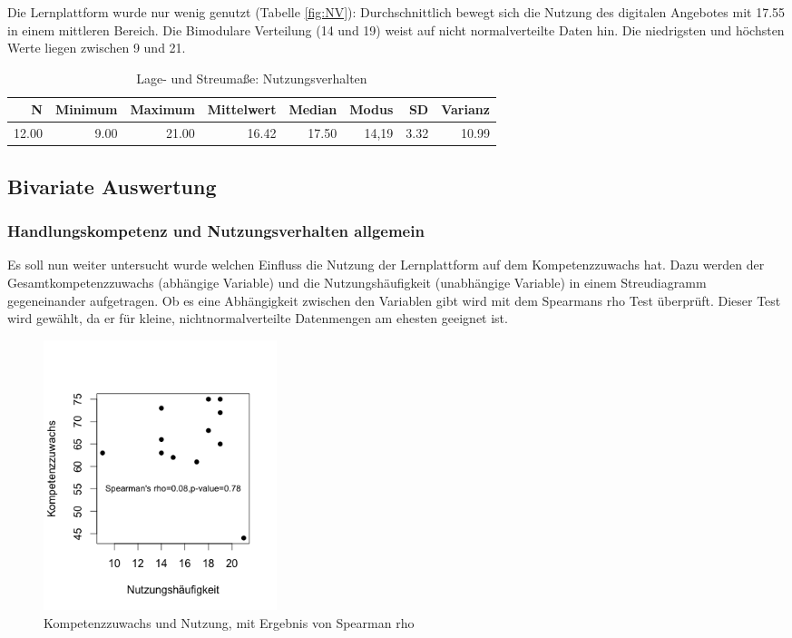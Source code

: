 \documentclass[12pt,smallheadings, bibliography=totoc]{scrartcl}
\begin{document}
Die Lernplattform wurde nur wenig genutzt (Tabelle \ref{fig:NV}):
Durchschnittlich bewegt sich die Nutzung des digitalen Angebotes mit
17.55 in einem mittleren Bereich. Die Bimodulare Verteilung (14 und 19)
weist auf nicht normalverteilte Daten hin. Die niedrigsten und höchsten
Werte liegen zwischen 9 und 21.

\begin{table}[H]
\centering
\caption{Lage- und Streumaße: Nutzungsverhalten}
\label{tab:NV}
\begin{tabular}{rrrrrrrr}
  \hline
  N & Minimum & Maximum & Mittelwert & Median & Modus & SD & Varianz \\
  \hline
 12.00 & 9.00 & 21.00 & 16.42 & 17.50 & 14,19 & 3.32 & 10.99 \\     
   \hline
\end{tabular}
\end{table}

\subsection{Bivariate Auswertung}\label{bivariate-auswertung}

\subsubsection{Handlungskompetenz und Nutzungsverhalten
allgemein}\label{handlungskompetenz-und-nutzungsverhalten-allgemein}

Es soll nun weiter untersucht wurde welchen Einfluss die Nutzung der
Lernplattform auf dem Kompetenzzuwachs hat. Dazu werden der
Gesamtkompetenzzuwachs (abhängige Variable) und die Nutzungshäufigkeit
(unabhängige Variable) in einem Streudiagramm gegeneinander aufgetragen.
Ob es eine Abhängigkeit zwischen den Variablen gibt wird mit dem
Spearmans rho Test überprüft. Dieser Test wird gewählt, da er für
kleine, nichtnormalverteilte Datenmengen am ehesten geeignet ist.

\begin{figure}[H]
\centering
\includegraphics[width=0.33\textwidth]{Anhang/Spearman.png}
\caption{Kompetenzzuwachs und Nutzung, mit Ergebnis von Spearman rho}
\label{fig:spear}
\end{figure}
\end{document}
